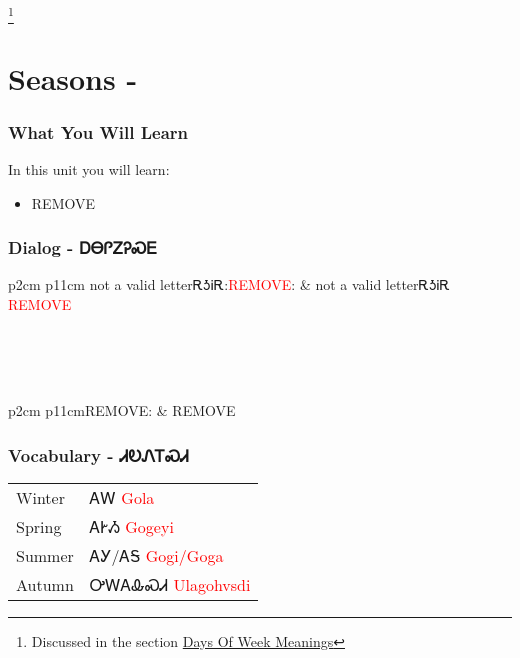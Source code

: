 \footnote{Discussed in the section \hyperref[sec:daysOfWeekMeaning]{Days Of Week Meanings}}
\index{}
\chapter{Seasons - }
\subsection{What You Will Learn}
In this unit you will learn:
\begin{itemize}
\item REMOVE
\end{itemize}\newpage

\newpage\subsection{Dialog - ᎠᎾᎵᏃᎮᏍᎬ}
\begin{tabular}{p{2cm} p{11cm}}
not a valid letterᎡᎼᎥᎡ:\newline \textcolor{red}{REMOVE}: & not a valid letterᎡᎼᎥᎡ 
\newline\textcolor{red}{REMOVE}\\
\end{tabular}
\\
\\
\\
\noindent\begin{tabular}{p{2cm} p{11cm}}REMOVE: & REMOVE\\
\end{tabular}
\vfill\newpage\subsection{Vocabulary - ᏗᎧᏁᎢᏍᏗ 
}
\begin{minipage}{\linewidth}
\begin{tabular}{p{3cm} p{11cm}}
Winter & ᎪᎳ 
 \newline \textcolor{red}{Gola}\\
Spring & ᎪᎨᏱ 
 \newline \textcolor{red}{Gogeyi}\\
Summer & ᎪᎩ/ᎪᎦ 
 \newline \textcolor{red}{Gogi/Goga}\\
Autumn & ᎤᎳᎪᎲᏍᏗ 
 \newline \textcolor{red}{Ulagohvsdi}\\
\end{tabular}
\end{minipage}

